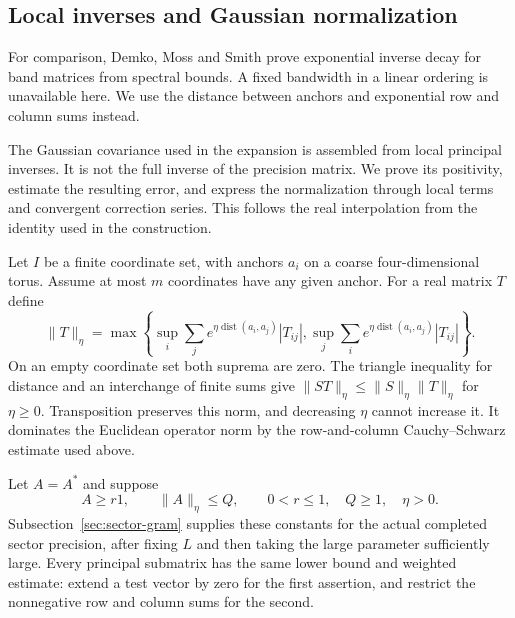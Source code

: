 \subsection{Local inverses and Gaussian normalization}
\label{sec:local-covariance}

For comparison, Demko, Moss and Smith
\cite[Theorem~2.4]{DemkoMossSmith} prove exponential inverse decay for
band matrices from spectral bounds. A fixed bandwidth in a linear
ordering is unavailable here. We use the distance between anchors
and exponential row and column sums instead.

The Gaussian covariance used in the expansion is assembled from local
principal inverses. It is not the full inverse of the precision matrix.
We prove its positivity, estimate the resulting error, and express the
normalization through local terms and convergent correction series.
This follows the real interpolation from the identity used in the
construction.

Let $I$ be a finite coordinate set, with anchors $a_i$ on a coarse
four-dimensional torus. Assume at most $m$ coordinates have any
given anchor. For a real matrix $T$ define
\[
 \|T\|_\eta=\max\left\{
 \sup_i\sum_j e^{\eta\operatorname{dist}(a_i,a_j)}|T_{ij}|,
 \sup_j\sum_i e^{\eta\operatorname{dist}(a_i,a_j)}|T_{ij}|
 \right\}.
\]
On an empty coordinate set both suprema are zero. The triangle
inequality for distance and an interchange of finite sums give
$\|ST\|_\eta\le\|S\|_\eta\|T\|_\eta$ for $\eta\ge0$.
Transposition preserves this norm, and decreasing $\eta$ cannot
increase it. It dominates the Euclidean operator norm by the
row-and-column Cauchy--Schwarz estimate used above.

Let $A=A^*$ and suppose
\begin{equation}\label{eq:covariance-data}
 A\ge r1,\qquad \|A\|_\eta\le Q,
 \qquad 0<r\le1,\quad Q\ge1,\quad\eta>0.
\end{equation}
Subsection~\ref{sec:sector-gram} supplies these constants for the
actual completed sector precision, after fixing $L$ and then
taking the large parameter sufficiently large. Every principal
submatrix has the same lower bound and weighted estimate: extend
a test vector by zero for the first assertion, and restrict the
nonnegative row and column sums for the second.


